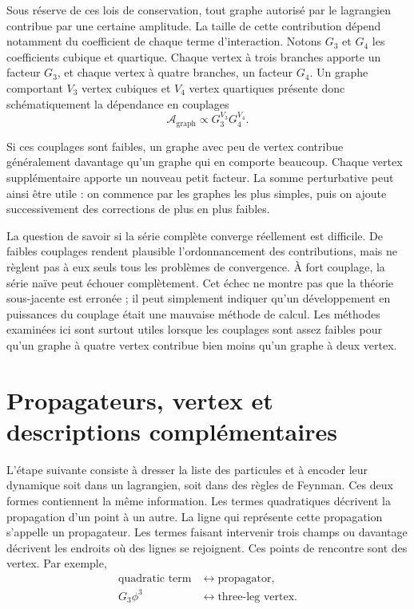 Sous réserve de ces lois de conservation, tout graphe autorisé par le lagrangien contribue par une certaine amplitude. La taille de cette contribution dépend notamment du coefficient de chaque terme d’interaction. Notons \(G_3\) et \(G_4\) les coefficients cubique et quartique. Chaque vertex à trois branches apporte un facteur \(G_3\), et chaque vertex à quatre branches, un facteur \(G_4\). Un graphe comportant \(V_3\) vertex cubiques et \(V_4\) vertex quartiques présente donc schématiquement la dépendance en couplages
\begin{equation}
\mathcal{A}_{\mathrm{graph}}
\propto G_3^{V_3}G_4^{V_4}.
\end{equation}

Si ces couplages sont faibles, un graphe avec peu de vertex contribue généralement davantage qu’un graphe qui en comporte beaucoup. Chaque vertex supplémentaire apporte un nouveau petit facteur. La somme perturbative peut ainsi être utile : on commence par les graphes les plus simples, puis on ajoute successivement des corrections de plus en plus faibles.

La question de savoir si la série complète converge réellement est difficile. De faibles couplages rendent plausible l’ordonnancement des contributions, mais ne règlent pas à eux seuls tous les problèmes de convergence. À fort couplage, la série naïve peut échouer complètement. Cet échec ne montre pas que la théorie sous-jacente est erronée ; il peut simplement indiquer qu’un développement en puissances du couplage était une mauvaise méthode de calcul. Les méthodes examinées ici sont surtout utiles lorsque les couplages sont assez faibles pour qu’un graphe à quatre vertex contribue bien moins qu’un graphe à deux vertex.

\begin{classroomqa}
\end{classroomqa}

\section{Propagateurs, vertex et descriptions complémentaires}

L’étape suivante consiste à dresser la liste des particules et à encoder leur dynamique soit dans un lagrangien, soit dans des règles de Feynman. Ces deux formes contiennent la même information. Les termes quadratiques décrivent la propagation d’un point à un autre. La ligne qui représente cette propagation s’appelle un propagateur. Les termes faisant intervenir trois champs ou davantage décrivent les endroits où des lignes se rejoignent. Ces points de rencontre sont des vertex. Par exemple,
\begin{equation}
\begin{aligned}
\text{quadratic term}
&\longleftrightarrow \text{propagator},\\
G_3\phi^3
&\longleftrightarrow \text{three-leg vertex}.
\end{aligned}
\end{equation}

